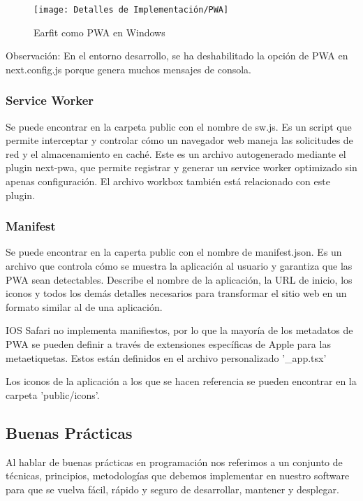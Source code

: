 \documentclass[12pt,twoside,titlepage]{report}
\begin{document}
\begin{figure}[H]
    \centering
    \texttt{[image: Detalles de Implementación/PWA]}
    \label{fig:PWA}
    \caption{Earfit como PWA en Windows}
\end{figure}

Observación: En el entorno desarrollo, se ha deshabilitado la opción de PWA en next.config.js porque genera muchos mensajes de consola.

\subsubsection{Service Worker}
Se puede encontrar en la carpeta public con el nombre de sw.js. Es un script que permite interceptar y controlar cómo un navegador web maneja las solicitudes de red y el almacenamiento en caché. Este es un archivo autogenerado mediante el plugin next-pwa, que permite registrar y generar un service worker optimizado sin apenas configuración. El archivo workbox también está relacionado con este plugin.

\subsubsection{Manifest}
Se puede encontrar en la caperta public con el nombre de manifest.json. Es un archivo que controla cómo se muestra la aplicación al usuario y garantiza que las PWA sean detectables. Describe el nombre de la aplicación, la URL de inicio, los iconos y todos los demás detalles necesarios para transformar el sitio web en un formato similar al de una aplicación. 

IOS Safari no implementa manifiestos, por lo que la mayoría de los metadatos de PWA se pueden definir a través de extensiones específicas de Apple para las metaetiquetas. Estos están definidos en el archivo personalizado '\_app.tsx'

Los iconos de la aplicación a los que se hacen referencia se pueden encontrar en la carpeta 'public/icons'.


\subsection{Buenas Prácticas}

Al hablar de buenas prácticas en programación nos referimos a un conjunto de técnicas, principios, metodologías que debemos implementar en nuestro software para que se vuelva fácil, rápido y seguro de desarrollar, mantener y desplegar.
\end{document}
